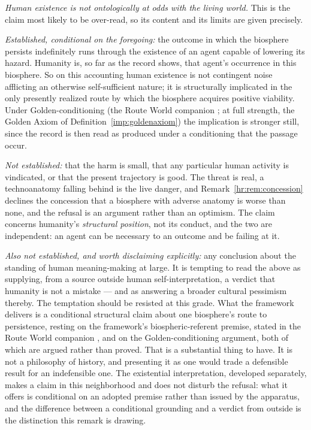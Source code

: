 \emph{Human existence is not ontologically at odds with the living
world.} This is the claim most likely to be over-read, so its content
and its limits are given precisely.

\begin{remark}\label{hr:rem:notmistake}
\emph{Established, conditional on the foregoing:} the outcome in which
the biosphere persists indefinitely runs through the existence of an
agent capable of lowering its hazard. Humanity is, so far as the record
shows, that agent's occurrence in this biosphere. So on this accounting
human existence is not contingent noise afflicting an otherwise
self-sufficient nature; it is structurally implicated in the only
presently realized route by which the biosphere acquires positive
viability. Under Golden-conditioning
(the Route World companion \cite{GoldenRouteWorld}; at full strength, the
Golden Axiom of Definition~\ref{imp:goldenaxiom}) the implication is stronger still, since the record is
then read as produced under a conditioning that the passage occur.

\emph{Not established:} that the harm is small, that any particular
human activity is vindicated, or that the present trajectory is good.
The threat is real, a technoanatomy falling behind is the live danger, and
Remark~\ref{hr:rem:concession} declines the concession that a biosphere
with adverse anatomy is worse than none, and the refusal is an argument
rather than an optimism. The claim concerns humanity's
\emph{structural position}, not its conduct, and the two are
independent: an agent can be necessary to an outcome and be failing at
it.

\emph{Also not established, and worth disclaiming explicitly:} any
conclusion about the standing of human meaning-making at large. It is
tempting to read the above as supplying, from a source outside human
self-interpretation, a verdict that humanity is not a mistake --- and as
answering a broader cultural pessimism thereby. The temptation should be
resisted at this grade. What the framework delivers is a conditional
structural claim about one biosphere's route to persistence, resting on
the framework's biospheric-referent premise, stated in the Route World companion \cite{GoldenRouteWorld}, and on the Golden-conditioning argument, both of which are
argued rather than proved. That is a substantial thing to have. It is
not a philosophy of history, and presenting it as one would trade a
defensible result for an indefensible one. The existential interpretation, developed separately, makes a
claim in this neighborhood and does not disturb the refusal: what it offers
is conditional on an adopted premise rather than issued by the
apparatus, and the difference between a conditional grounding and a verdict
from outside is the distinction this remark is drawing.
\end{remark}

